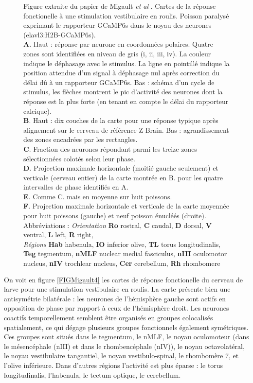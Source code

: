 \addtocounter{figure}{-1}
\begin{figure}
\caption{
Figure extraite du papier de Migault \emph{et al} \cite{migault_whole-brain_2018}. Cartes de la réponse fonctionelle à une stimulation vestibulaire en roulis. Poisson paralysé exprimant le rapporteur GCaMP6s dans le noyau des neurones (elavl3:H2B-GCaMP6s).
\\\textbf{A}. Haut : réponse par neurone en coordonnées polaires. Quatre zones sont identifiées en niveau de gris (i, ii, iii, iv). La couleur indique le déphasage avec le stimulus. La ligne en pointillé indique la position attendue d'un signal à déphasage nul après correction du délai dû à un rapporteur GCaMP6s. Bas : schéma d'un cycle de stimulus, les flèches montrent le pic d'activité des neurones dont la réponse est la plus forte (en tenant en compte le délai du rapporteur calcique).
\\\textbf{B}. Haut : dix couches de la carte pour une réponse typique après alignement sur le cerveau de référence Z-Brain. Bas : agrandissement des zones encadrées par les rectangles.
\\\textbf{C}. Fraction des neurones répondant parmi les treize zones sélectionnées colotés selon leur phase.
\\\textbf{D}. Projection maximale horizontale (moitié gauche seulement) et verticale (cerveau entier) de la carte montrée en B. pour les quatre intervalles de phase identifiés en A.
\\\textbf{E}. Comme C. mais en moyenne sur huit poissons.
\\\textbf{F}. Projection maximale horizontale et verticale de la carte moyennée pour huit poissons (gauche) et neuf poisson énucléés (droite).
\\Abbréviations : \emph{Orientation} \textbf{Ro} rostral, \textbf{C} caudal, \textbf{D} dorsal, \textbf{V} ventral, \textbf{L} left, \textbf{R} right,
\\\emph{Régions}  \textbf{Hab} habenula, \textbf{IO} inferior olive, \textbf{TL} torus longitudinalis, \textbf{Teg} tegmentum, \textbf{nMLF} nuclear medial fasciculus, \textbf{nIII} oculomotor nucleus, \textbf{nIV} trochlear nucleus, \textbf{Cer} cerebellum, \textbf{Rh} rhombomere
}
\end{figure}

On voit en figure \ref{FIGMigault4} les cartes de réponse fonctionelle du cerveau de larve pour une stimulation vestibulaire en roulis. La carte présente bien une antisymétrie bilatérale : les neurones de l'hémisphère gauche sont actifs en opposition de phase par rapport à ceux de l'hémisphère droit. Les neurones coactifs temporellement semblent être organisés en groupes colocalisés spatialement, ce qui dégage plusieurs groupes fonctionnels également symétriques.
Ces groupes sont situés dans le tegmentum, le nMLF, le noyau oculomoteur (dans le mésencéphale (nIII) et dans le rhombencéphale (nIV)), le noyau octavolatéral, le noyau vestibulaire tangantiel, le noyau vestibulo-spinal, le rhombomère 7, et l'olive inférieure. Dans d'autres régions l'activité est plus éparse : le torus longitudinalis, l'habenula, le tectum optique, le cerebellum.

